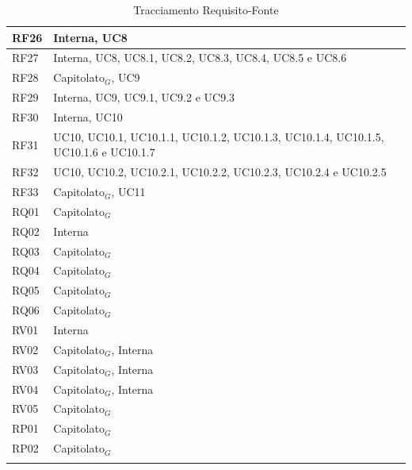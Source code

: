 \documentclass[10pt]{article}
\begin{document}
\begin{justify}
\begin{center}
\begin{longtable}{|>{\vspace{5pt}}C{2.7cm}<{\vspace{5pt}}|>{\vspace{5pt}}C{2.7cm}<{\vspace{5pt}}|}
\hline
RF26 & Interna, UC8\\
\hline
RF27 & Interna, UC8, UC8.1, UC8.2, UC8.3, UC8.4, UC8.5 e UC8.6\\
\hline
RF28 & Capitolato$_G$, UC9\\
\hline
RF29 & Interna, UC9, UC9.1, UC9.2 e UC9.3\\
\hline
RF30 & Interna, UC10\\
\hline
RF31 & UC10, UC10.1, UC10.1.1, UC10.1.2, UC10.1.3, UC10.1.4, UC10.1.5, UC10.1.6 e UC10.1.7\\
\hline
RF32 & UC10, UC10.2, UC10.2.1, UC10.2.2, UC10.2.3, UC10.2.4 e UC10.2.5\\
\hline
RF33 & Capitolato$_G$, UC11\\
\hline
RQ01 & Capitolato$_G$\\
\hline
RQ02 & Interna\\
\hline
RQ03 & Capitolato$_G$\\
\hline
RQ04 & Capitolato$_G$\\
\hline
RQ05 & Capitolato$_G$\\
\hline
RQ06 & Capitolato$_G$\\
\hline
RV01 & Interna\\
\hline
RV02 & Capitolato$_G$, Interna\\
\hline
RV03 & Capitolato$_G$, Interna\\
\hline
RV04 & Capitolato$_G$, Interna\\
\hline
RV05 & Capitolato$_G$\\
\hline
RP01 & Capitolato$_G$\\
\hline
RP02 & Capitolato$_G$\\
\hline
\caption{Tracciamento Requisito-Fonte}
\end{longtable}
\end{center}



\end{justify}
\end{document}
